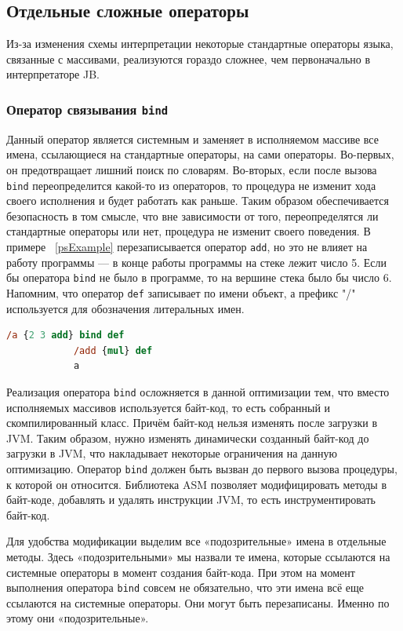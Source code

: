 \documentclass[14pt]{extarticle}
\begin{document}
	\subsection{Отдельные сложные операторы}
	Из-за изменения схемы интерпретации некоторые стандартные операторы языка, связанные с массивами, реализуются гораздо сложнее, чем первоначально в интерпретаторе JB. 
	\subsubsection*{Оператор связывания \texttt{bind}}
	Данный оператор является системным и заменяет в исполняемом массиве все имена, ссылающиеся на стандартные операторы, на сами операторы.	Во-первых, он предотвращает лишний поиск по словарям. Во-вторых, если после вызова \texttt{bind} переопределится какой-то из операторов, то процедура не изменит хода своего исполнения и будет работать как раньше. Таким образом обеспечивается безопасность в том смысле, что вне зависимости от того, переопределятся ли стандартные операторы или нет, процедура не изменит своего поведения. В примере ~\ref{psExample} перезаписывается оператор \texttt{add}, но это не влияет на работу программы ---  в конце работы программы на стеке лежит число 5. Если бы оператора \texttt{bind} не было в программе, то на вершине стека было бы число 6. Напомним, что оператор \texttt{def} записывает по имени объект, а префикс "/"\,  используется для обозначения литеральных имен.  
		\begin{lstlisting}[float, label=psExample,caption=пример на PostScript на оператор \texttt{bind},captionpos=b, frame = single, language = PostScript]
			/a {2 3 add} bind def
			/add {mul} def
			a
		\end{lstlisting}
	

	Реализация оператора \texttt{bind} осложняется в данной оптимизации тем, что вместо исполняемых массивов используется байт-код, то есть собранный и скомпилированный класс. Причём байт-код нельзя изменять после загрузки в JVM.  Таким образом,  нужно изменять динамически созданный байт-код до загрузки в JVM, что накладывает некоторые ограничения на данную оптимизацию. Оператор \texttt{bind} должен быть вызван до первого вызова процедуры, к которой он относится. Библиотека ASM позволяет модифицировать методы в байт-коде, добавлять и удалять инструкции JVM, то есть инструментировать байт-код. 
	
	Для удобства модификации выделим все «подозрительные» имена в отдельные методы. Здесь «подозрительными» мы назвали те имена, которые ссылаются на системные операторы в момент создания байт-кода. При этом на момент выполнения оператора \texttt{bind} совсем не обязательно, что эти имена всё еще ссылаются на системные операторы. Они могут быть перезаписаны. Именно по этому они «подозрительные».
	
\end{document}

